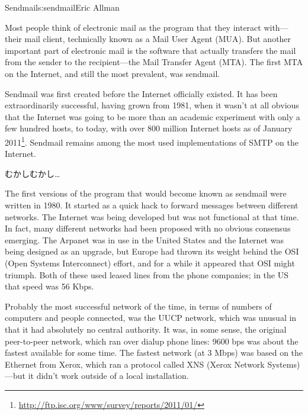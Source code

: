 \begin{aosachapter}{Sendmail}{s:sendmail}{Eric Allman}

Most people think of electronic mail as the program that they interact
with---their mail client, technically known as a Mail User Agent
(MUA).  But another important part of electronic mail is the software
that actually transfers the mail from the sender to the
recipient---the Mail Transfer Agent (MTA).  The first MTA on the
Internet, and still the most prevalent, was sendmail.

Sendmail was first created before the Internet officially existed. It
has been extraordinarily successful, having grown from 1981, when it
wasn't at all obvious that the Internet was going to be more than an
academic experiment with only a few hundred hosts, to today, with over
800 million Internet hosts as of January
2011\footnote{\url{http://ftp.isc.org/www/survey/reports/2011/01/}}.
Sendmail remains among the most used implementations of SMTP on the Internet.

\begin{aosasect1}{むかしむかし\ldots}

The first versions of the program that would become known as sendmail
were written in 1980. It started as a quick hack to forward messages
between different networks.  The Internet was being developed but was
not functional at that time.  In fact, many different networks had been
proposed with no obvious consensus emerging.  The Arpanet was in use
in the United States and the Internet was being designed as an
upgrade, but Europe had thrown its weight behind the OSI (Open Systems
Interconnect) effort, and for a while it appeared that OSI might
triumph. Both of these used leased lines from the phone companies; in
the US that speed was 56 Kbps.

Probably the most successful network of the time,
in terms of numbers of computers
and people connected, was the UUCP network, which was unusual in that
it had absolutely no central authority. It was, in some sense, the
original peer-to-peer network, which ran over dialup phone lines: 9600
bps was about the fastest available for some time. The fastest network
(at 3 Mbps) was based on the Ethernet from Xerox, which ran a protocol
called XNS (Xerox Network Systems)---but it didn't work outside of a
local installation.


\end{aosasect1}
\end{aosachapter}
